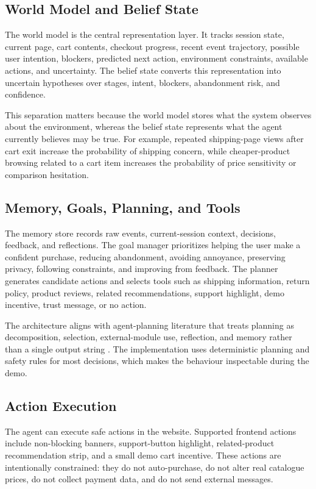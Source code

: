 \documentclass{article}
\begin{document}
\subsection{World Model and Belief State}
The world model is the central representation layer. It tracks session state, current page, cart contents, checkout progress, recent event trajectory, possible user intention, blockers, predicted next action, environment constraints, available actions, and uncertainty. The belief state converts this representation into uncertain hypotheses over stages, intent, blockers, abandonment risk, and confidence.

This separation matters because the world model stores what the system observes about the environment, whereas the belief state represents what the agent currently believes may be true. For example, repeated shipping-page views after cart exit increase the probability of shipping concern, while cheaper-product browsing related to a cart item increases the probability of price sensitivity or comparison hesitation.

\subsection{Memory, Goals, Planning, and Tools}
The memory store records raw events, current-session context, decisions, feedback, and reflections. The goal manager prioritizes helping the user make a confident purchase, reducing abandonment, avoiding annoyance, preserving privacy, following constraints, and improving from feedback. The planner generates candidate actions and selects tools such as shipping information, return policy, product reviews, related recommendations, support highlight, demo incentive, trust message, or no action.

The architecture aligns with agent-planning literature that treats planning as decomposition, selection, external-module use, reflection, and memory rather than a single output string \cite{huang2024planning}. The implementation uses deterministic planning and safety rules for most decisions, which makes the behaviour inspectable during the demo.

\subsection{Action Execution}
The agent can execute safe actions in the website. Supported frontend actions include non-blocking banners, support-button highlight, related-product recommendation strip, and a small demo cart incentive. These actions are intentionally constrained: they do not auto-purchase, do not alter real catalogue prices, do not collect payment data, and do not send external messages.
\end{document}
